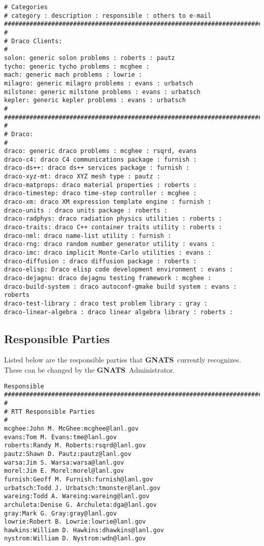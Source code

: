 \documentclass[11pt]{nmemo}
\newcommand{\gnats}{{\normalfont\bfseries GNATS}}
\begin{document}
\begin{verbatim}
# Categories
# category : description : responsible : others to e-mail 
#######################################################################
#
# Draco Clients:
#
solon: generic solon problems : roberts : pautz
tycho: generic tycho problems : mcghee : 
mach: generic mach problems : lowrie : 
milagro: generic milagro problems : evans : urbatsch
milstone: generic milstone problems : evans : urbatsch
kepler: generic kepler problems : evans : urbatsch
#
#######################################################################
#
# Draco:
#
draco: generic draco problems : mcghee : rsqrd, evans
draco-c4: draco C4 communications package : furnish :
draco-ds++: draco ds++ services package : furnish :
draco-xyz-mt: draco XYZ mesh type : pautz : 
draco-matprops: draco material properties : roberts : 
draco-timestep: draco time-step controller : mcghee : 
draco-xm: draco XM expression template engine : furnish : 
draco-units : draco units package : roberts : 
draco-radphys: draco radiation physics utilities : roberts : 
draco-traits: draco C++ container traits utility : roberts : 
draco-nml: draco name-list utility : furnish : 
draco-rng: draco random number generator utility : evans : 
draco-imc: draco implicit Monte-Carlo utilities : evans : 
draco-diffusion : draco diffusion package : roberts : 
draco-elisp: Draco elisp code development environment : evans :
draco-dejagnu: draco dejagnu testing framework : mcghee : 
draco-build-system : draco autoconf-gmake build system : evans : roberts
draco-test-library : draco test problem library : gray : 
draco-linear-algebra : draco linear algebra library : roberts :
\end{verbatim}

\subsection{Responsible Parties}
Listed below are the responsible parties that \gnats\ currently recognizes.
These can be changed by the \gnats\ Administrator.

\begin{verbatim}
Responsible
#######################################################################
#
# RTT Responsible Parties
#
mcghee:John M. McGhee:mcghee@lanl.gov
evans:Tom M. Evans:tme@lanl.gov
roberts:Randy M. Roberts:rsqrd@lanl.gov
pautz:Shawn D. Pautz:pautz@lanl.gov
warsa:Jim S. Warsa:warsa@lanl.gov
morel:Jim E. Morel:morel@lanl.gov
furnish:Geoff M. Furnish:furnish@lanl.gov
urbatsch:Todd J. Urbatsch:tmonster@lanl.gov
wareing:Todd A. Wareing:wareing@lanl.gov
archuleta:Denise G. Archuleta:dga@lanl.gov
gray:Mark G. Gray:gray@lanl.gov
lowrie:Robert B. Lowrie:lowrie@lanl.gov
hawkins:William D. Hawkins:dhawkins@lanl.gov
nystrom:William D. Nystrom:wdn@lanl.gov
\end{verbatim}
\end{document}
